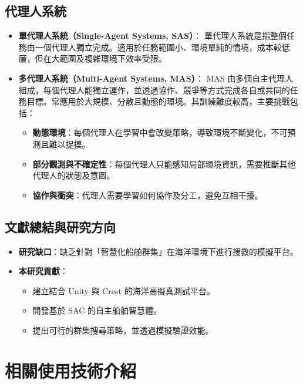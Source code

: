 \documentclass[12pt,a4paper]{article}
\begin{document}
\subsection{代理人系統}

\begin{itemize}
  \item \textbf{單代理人系統（Single-Agent Systems, SAS）}：
  單代理人系統是指整個任務由一個代理人獨立完成。適用於任務範圍小、環境單純的情境，成本較低廉，但在大範圍及複雜環境下效率受限。
  
  \item \textbf{多代理人系統（Multi-Agent Systems, MAS）}：
  MAS 由多個自主代理人組成，每個代理人能獨立運作，並透過協作、競爭等方式完成各自或共同的任務目標。常應用於大規模、分散且動態的環境。其訓練難度較高，主要挑戰包括：
  \begin{itemize}
    \item \textbf{動態環境}：每個代理人在學習中會改變策略，導致環境不斷變化，不可預測且難以捉摸。
    \item \textbf{部分觀測與不確定性}：每個代理人只能感知局部環境資訊，需要推斷其他代理人的狀態及意圖。
    \item \textbf{協作與衝突}：代理人需要學習如何協作及分工，避免互相干擾。
  \end{itemize}
\end{itemize}

\subsection{文獻總結與研究方向}

\begin{itemize}
  \item \textbf{研究缺口}：缺乏針對「智慧化船舶群集」在海洋環境下進行搜救的模擬平台。
  \item \textbf{本研究貢獻}：
  \begin{itemize}
    \item 建立結合 Unity 與 Crest 的海洋高擬真測試平台。
    \item 開發基於 SAC 的自主船舶智慧體。
    \item 提出可行的群集搜尋策略，並透過模擬驗證效能。
  \end{itemize}
\end{itemize}

\section{相關使用技術介紹}
\end{document}
